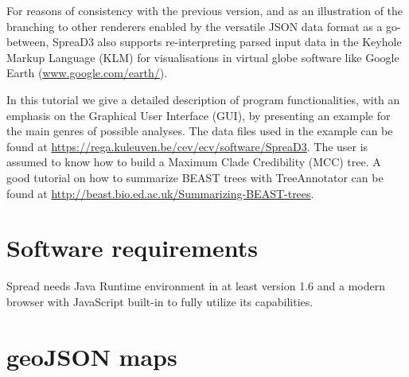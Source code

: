 \documentclass[english]{paper}
\begin{document}
For reasons of consistency with the previous version, and as an illustration of the branching to other renderers enabled by the versatile JSON data format as a go-between, SpreaD3 also supports re-interpreting parsed input data in the Keyhole Markup Language (KLM) for visualisations in virtual globe software like Google Earth (\url{www.google.com/earth/}). 
\par
In this tutorial we give a detailed description of program functionalities, with an emphasis on the Graphical User Interface (GUI), by presenting an example for the main genres of possible analyses. %
The data files used in the example can be found at  \url{https://rega.kuleuven.be/cev/ecv/software/SpreaD3}.
The user is assumed to know how to build a Maximum Clade Credibility (MCC) tree. 
A good tutorial on how to summarize BEAST trees with TreeAnnotator can be found at \url{http://beast.bio.ed.ac.uk/Summarizing-BEAST-trees}.

\section{Software requirements}

Spread needs Java Runtime environment in at least version 1.6 and a modern browser with JavaScript built-in to fully utilize its capabilities.

\section{geoJSON maps}	
\end{document}
